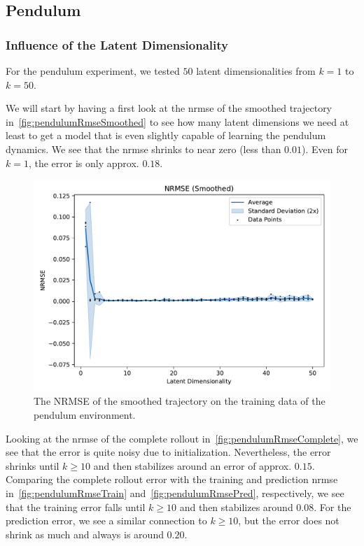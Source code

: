 	\subsection{Pendulum} %

		\subsubsection{Influence of the Latent Dimensionality}
			For the pendulum experiment, we tested \(50\) latent dimensionalities from \( k = 1 \) to \( k = 50 \).

			We will start by having a first look at the \ac{nrmse} of the smoothed trajectory in~\autoref{fig:pendulumRmseSmoothed} to see how many latent dimensions we need at least to get a model that is even slightly capable of learning the pendulum dynamics. We see that the \ac{nrmse} shrinks to near zero (less than \( 0.01 \)). Even for \( k = 1 \), the error is only approx. \( 0.18 \).

			\begin{figure}
				\centering
				\includegraphics[width=0.7\linewidth]{figures/results/pendulum-damped/latent-dim/comparison-rmse-smoothed-normalized-mean-vs-latent-dim.pdf}
				\caption[Error of the smoothed trajectory on the training data of the pendulum experiment]{The NRMSE of the smoothed trajectory on the training data of the pendulum environment.}
				\label{fig:pendulumRmseSmoothed}
			\end{figure}

			Looking at the \ac{nrmse} of the complete rollout in~\autoref{fig:pendulumRmseComplete}, we see that the error is quite noisy due to initialization. Nevertheless, the error shrinks until \( k \geq 10 \) and then stabilizes around an error of approx. \(0.15\). Comparing the complete rollout error with the training and prediction \ac{nrmse} in~\autoref{fig:pendulumRmseTrain} and~\autoref{fig:pendulumRmsePred}, respectively, we see that the training error falls until \( k \geq 10 \) and then stabilizes around \(0.08\). For the prediction error, we see a similar connection to \( k \geq 10 \), but the error does not shrink as much and always is around \(0.20\).

